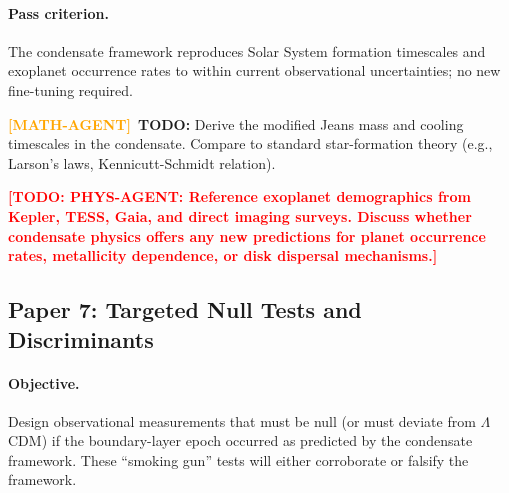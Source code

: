 \documentclass[11pt,a4paper]{article}
\theoremstyle{definition}
\newcommand{\TODO}[1]{\textcolor{red}{\textbf{[TODO: #1]}}}
\newcommand{\MATHAGENT}{\textcolor{orange}{\textbf{[MATH-AGENT]}}}
\begin{document}
\paragraph{Pass criterion.}
The condensate framework reproduces Solar System formation timescales and exoplanet occurrence rates to within current observational uncertainties; no new fine-tuning required.

\MATHAGENT~\textbf{TODO:} Derive the modified Jeans mass and cooling timescales in the condensate. Compare to standard star-formation theory (e.g., Larson's laws, Kennicutt-Schmidt relation).

\TODO{PHYS-AGENT: Reference exoplanet demographics from Kepler, TESS, Gaia, and direct imaging surveys. Discuss whether condensate physics offers any new predictions for planet occurrence rates, metallicity dependence, or disk dispersal mechanisms.}

\subsection{Paper 7: Targeted Null Tests and Discriminants}
\label{sec:paper7}

\paragraph{Objective.}
Design observational measurements that must be null (or must deviate from $\Lambda$CDM) if the boundary-layer epoch occurred as predicted by the condensate framework. These ``smoking gun'' tests will either corroborate or falsify the framework.
\end{document}
